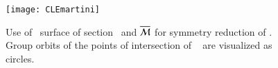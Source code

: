 {%
\begin{figure}[ht]
\begin{center}
  \texttt{[image: CLEmartini]}
\end{center}
\caption{
Use of \Poincare\ surface of section \PoincS\ and {\slice}
$\overline{\cal M}$ for symmetry reduction of \cLf. Group orbits of the
points of intersection of \rpo\  are visualized as
circles.
    }
\label{fig:CLEmartini}
\end{figure}
}
